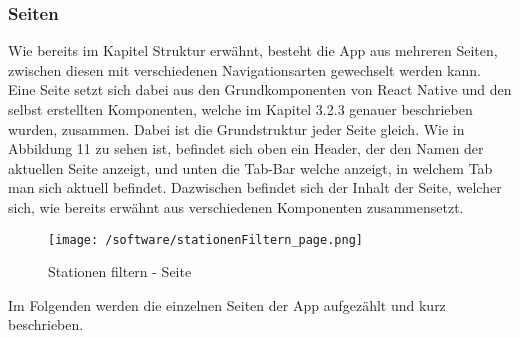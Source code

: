 \documentclass[11pt, twoside]{article}
\begin{document}
\subsubsection{Seiten}
Wie bereits im Kapitel Struktur erwähnt, besteht die App aus mehreren Seiten, zwischen diesen mit verschiedenen Navigationsarten gewechselt werden kann. Eine Seite setzt sich dabei aus den Grundkomponenten von React Native und den selbst erstellten Komponenten, welche im Kapitel 3.2.3 genauer beschrieben wurden, zusammen. Dabei ist die Grundstruktur jeder Seite gleich. Wie in Abbildung 11 zu sehen ist, befindet sich oben ein Header, der den Namen der aktuellen Seite anzeigt, und unten die Tab-Bar welche anzeigt, in welchem Tab man sich aktuell befindet. Dazwischen befindet sich der Inhalt der Seite, welcher sich, wie bereits erwähnt aus verschiedenen Komponenten zusammensetzt.
\begin{figure}[H]
     		\texttt{[image: /software/stationenFiltern\_page.png]}
    			\caption{\glqq Stationen filtern \grqq{} - Seite}
    		\end{figure}
Im Folgenden werden die einzelnen Seiten der App aufgezählt und kurz beschrieben.
\end{document}
